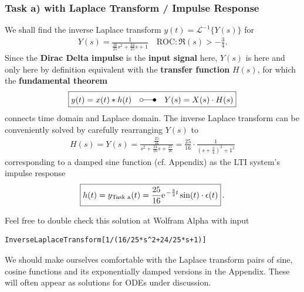 \documentclass[11pt,a4paper,DIV=12]{scrartcl}
\begin{document}
\subsubsection{Task a) with Laplace Transform / Impulse Response}
\label{sec:TransferFunction}
We shall find the inverse Laplace transform
$y(t) = \mathcal{L}^{-1}\{Y(s)\}$ for
\begin{align}
Y(s) = \frac{1}{\frac{16}{25} s^2 + \frac{24}{25} s + 1}
\quad \text{ROC}: \Re(s) > -\frac{3}{4}.
\end{align}
Since the \textbf{Dirac Delta impulse} is the \textbf{input signal} here,
$Y(s)$ is here and only here by definition equivalent with the
\textbf{transfer function} $H(s)$, for which the \textbf{fundamental theorem}
\begin{align}
\boxed{y(t) = x(t)*h(t) \quad \laplace \quad Y(s) = X(s) \cdot H(s)}
\end{align}
connects time domain and Laplace domain.
%
The inverse Laplace transform can be conveniently solved by carefully
rearranging
$Y(s)$ to
\begin{align}
H(s) = Y(s) = \frac{\frac{25}{16}}{s^2 + \frac{24}{16} s + \frac{25}{16}}=
\frac{25}{16} \cdot \frac{1}{(s + \frac{3}{4})^2 + 1^2}
\end{align}
corresponding to a damped sine function (cf. Appendix) as the LTI system's
impulse response
\begin{align}
\boxed{h(t) = y_\text{Task a}(t) = \frac{25}{16} \e^{-\frac{3}{4} t} \sin(t)
\cdot \epsilon(t)}\,.
\end{align}

Feel free to double check this solution at Wolfram Alpha with input
\begin{verbatim}
InverseLaplaceTransform[1/(16/25*s^2+24/25*s+1)]
\end{verbatim}

We should make ourselves comfortable with the Laplace transform pairs of sine, cosine
functions and its exponentially damped versions in the Appendix.
These will often appear as solutions for ODEs under discussion.


\end{document}
